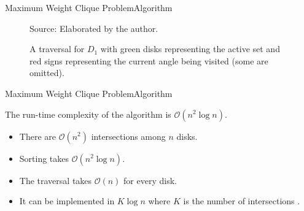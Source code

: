 \documentclass{beamer}
\newcommand{\bigO}{\mathscr{O}}
\newcommand{\source}[1]{\caption*{Source: {#1}} }
\begin{document}
	
%	

\begin{frame}{Maximum Weight Clique Problem}{Algorithm}

	\begin{figure}
		\caption{A traversal for $D_1$ with green disks representing the active set and red signs representing the current angle being visited (some are omitted).}
			\source{Elaborated by the author.}
	\end{figure}
\end{frame}


\begin{frame}{Maximum Weight Clique Problem}{Algorithm}
	
	The run-time complexity of the algorithm is $\bigO(n^2\log{n})$.
	
	\begin{itemize}
		\item There are $\bigO(n^2)$ intersections among $n$ disks.
		
		\item Sorting takes $\bigO(n^2\log{n})$.
		
		\item The traversal takes $\bigO(n)$ for every disk.
		
		\item It can be implemented in $K\log{n}$ where $K$ is the number of intersections \autocite{bentley:1979}.
	\end{itemize}

\end{frame}
\end{document}
